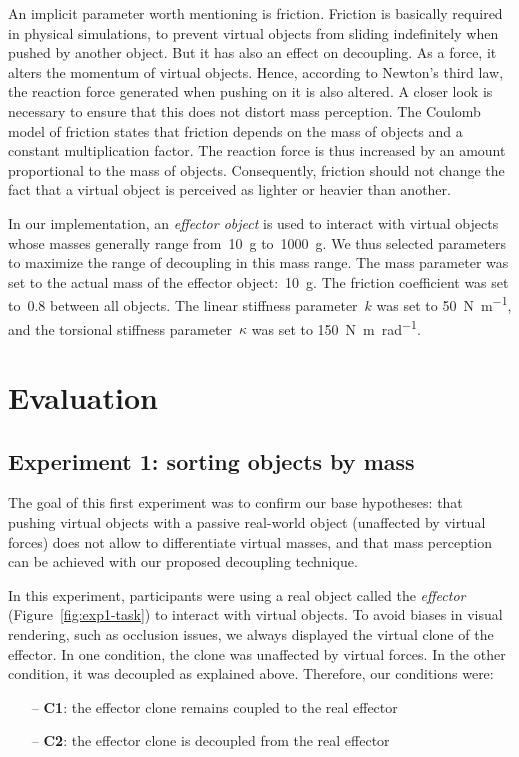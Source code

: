\documentclass{vgtc}
\begin{document}
An implicit parameter worth mentioning is friction. Friction is basically required in physical simulations, to prevent virtual objects from sliding indefinitely when pushed by another object. But it has also an effect on decoupling. As a force, it alters the momentum of virtual objects. Hence, according to Newton's third law, the reaction force generated when pushing on it is also altered. A closer look is necessary to ensure that this does not distort mass perception. The Coulomb model of friction states that friction depends on the mass of objects and a constant multiplication factor. The reaction force is thus increased by an amount proportional to the mass of objects. Consequently, friction should not change the fact that a virtual object is perceived as lighter or heavier than another.

\label{sec:parameters}
In our implementation, an \emph{effector object} is used to interact with virtual objects whose masses generally range from~\SI{10}{\gram} to~\SI{1000}{\gram}. We thus selected parameters to maximize the range of decoupling in this mass range. The mass parameter was set to the actual mass of the effector object:~\SI{10}{\gram}. The friction coefficient was set to~0.8 between all objects. The linear stiffness parameter~$k$ was set to \SI{50}{\newton\per\meter}, and the torsional stiffness parameter~$\kappa$ was set to \SI{150}{\newton\meter\per\radian}.

\section{Evaluation}

\subsection{Experiment 1: sorting objects by mass}

The goal of this first experiment was to confirm our base hypotheses: that pushing virtual objects with a passive real-world object (unaffected by virtual forces) does not allow to differentiate virtual masses, and that mass perception can be achieved with our proposed decoupling technique.

In this experiment, participants were using a real object called the \emph{effector} (Figure~\ref{fig:exp1-task}) to interact with virtual objects. To avoid biases in visual rendering, such as occlusion issues, we always displayed the virtual clone of the effector. In one condition, the clone was unaffected by virtual forces. In the other condition, it was decoupled as explained above. Therefore, our conditions were:
\begin{itemize}
\item[--] \textbf{C1}: the effector clone remains coupled to the real effector
\item[--] \textbf{C2}: the effector clone is decoupled from the real effector
\end{itemize}
\end{document}
